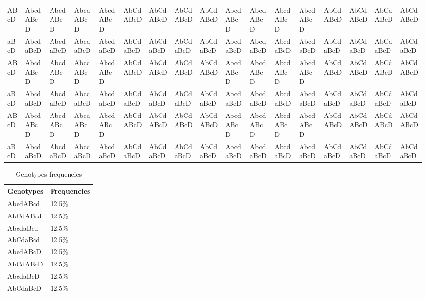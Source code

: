 \documentclass{article}
\begin{document}
\begin{table}[]
\begin{tabular}{l|llllllllllllllll}
ABcD & AbcdABcD & AbcdABcD & AbcdABcD & AbcdABcD & AbCdABcD & AbCdABcD & AbCdABcD & AbCdABcD & AbcdABcD & AbcdABcD & AbcdABcD & AbcdABcD & AbCdABcD & AbCdABcD & AbCdABcD & AbCdABcD \\ 
aBcD & AbcdaBcD & AbcdaBcD & AbcdaBcD & AbcdaBcD & AbCdaBcD & AbCdaBcD & AbCdaBcD & AbCdaBcD & AbcdaBcD & AbcdaBcD & AbcdaBcD & AbcdaBcD & AbCdaBcD & AbCdaBcD & AbCdaBcD & AbCdaBcD \\ 
ABcD & AbcdABcD & AbcdABcD & AbcdABcD & AbcdABcD & AbCdABcD & AbCdABcD & AbCdABcD & AbCdABcD & AbcdABcD & AbcdABcD & AbcdABcD & AbcdABcD & AbCdABcD & AbCdABcD & AbCdABcD & AbCdABcD \\ 
aBcD & AbcdaBcD & AbcdaBcD & AbcdaBcD & AbcdaBcD & AbCdaBcD & AbCdaBcD & AbCdaBcD & AbCdaBcD & AbcdaBcD & AbcdaBcD & AbcdaBcD & AbcdaBcD & AbCdaBcD & AbCdaBcD & AbCdaBcD & AbCdaBcD \\ 
ABcD & AbcdABcD & AbcdABcD & AbcdABcD & AbcdABcD & AbCdABcD & AbCdABcD & AbCdABcD & AbCdABcD & AbcdABcD & AbcdABcD & AbcdABcD & AbcdABcD & AbCdABcD & AbCdABcD & AbCdABcD & AbCdABcD \\ 
aBcD & AbcdaBcD & AbcdaBcD & AbcdaBcD & AbcdaBcD & AbCdaBcD & AbCdaBcD & AbCdaBcD & AbCdaBcD & AbcdaBcD & AbcdaBcD & AbcdaBcD & AbcdaBcD & AbCdaBcD & AbCdaBcD & AbCdaBcD & AbCdaBcD 
\end{tabular}
\end{table}\begin{table}[]
\centering
\caption{Genotypes frequencies}
\label{genotypesfreq}
\begin{tabular}{ll}
\hline
Genotypes & Frequencies \\ \hline
AbcdABcd & 12.5\% \\ \hline 
AbCdABcd & 12.5\% \\ \hline 
AbcdaBcd & 12.5\% \\ \hline 
AbCdaBcd & 12.5\% \\ \hline 
AbcdABcD & 12.5\% \\ \hline 
AbCdABcD & 12.5\% \\ \hline 
AbcdaBcD & 12.5\% \\ \hline 
AbCdaBcD & 12.5\% \\ \hline 

\end{tabular}
\end{table}
\end{document}
